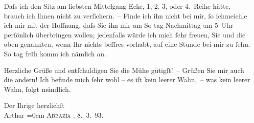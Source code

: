 \pstart
            Daſs ich den Sitz am liebsten Mittelgang Ecke, 1, 2, 3, oder 4. Reihe hätte,
                    brauch ich Ihnen nicht zu verſichern. – Finde ich ihn nicht bei mir,{ }ſo{ }ſchmeichle ich mir mit der Hoffnung, daſs Sie ihn mir am  So {\geminationn} tag { }Nachmittag um 5 Uhr perſönlich überbringen wollen; jedenfalls würde
                    ich {\pb}mich{ }ſehr freuen, Sie und die oben
                    genannten, wenn Ihr nichts beſſres vorhabt, auf eine Stunde bei mir zu{ }ſehn. So
                        {\geminationn} tag früh komm ich nämlich an. \pend
           
\pstart
            Herzliche Grüße und entſchuldigen Sie die Mühe gütigſt! – Grüßen Sie mir auch
                    die andern! Ich befinde mich{ }ſehr wohl – {\pb}es iſt
                    kein leerer Wahn, – was kein leerer Wahn, folgt mündlich. \pend
           
\pstart
            Der Ihrige herzlichſt {\\[\baselineskip]}\spacefill\mbox{Arthur}\pend
           \leftskip=0em{}
\pstart
           \textsc{Abbazia} , 8. 3. 93.\pend
           \endnumbering{}  
      